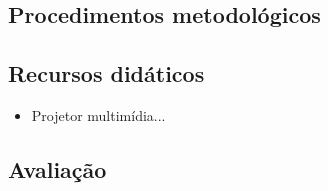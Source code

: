 \documentclass[
	article,			%
	12pt,				%
	twoside,			%
	a4paper,			%
	english,			%
	brazil,				%
	sumario=tradicional
]{abntex2-modelo-plano-de-aula}
\begin{document}
\begin{snugshade}
	\section{Procedimentos metodológicos} %
\end{snugshade}





\begin{snugshade}
	\section{Recursos didáticos} %
\end{snugshade}

\begin{itemize}
	
	\item Projetor multimídia...
	
\end{itemize}

\begin{snugshade}
	\section{Avaliação} %
\end{snugshade}

\end{document}
